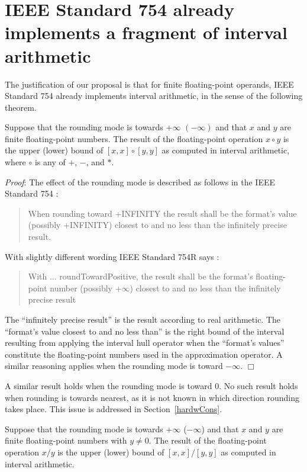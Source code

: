 \documentclass[11pt]{article}
\begin{document}
\section{IEEE Standard 754 already implements a fragment of interval
  arithmetic}
\label{fragmIA}

The justification of our proposal is that for finite floating-point operands,
IEEE Standard 754 already implements interval arithmetic, in the sense of the
following theorem.
\begin{theorem}
\label{mainThm}
Suppose that the rounding mode is towards $+\infty$
$(-\infty)$ and that $x$ and $y$ are finite floating-point numbers.
The result of the floating-point operation $x \circ y$
is the upper (lower) bound of $[x,x] \circ [y,y]$
as computed in interval arithmetic, where $\circ$ is any of $+$, $-$,
and $*$.
\end{theorem}
\emph{Proof}:
The effect of the rounding mode is described as follows in the
IEEE Standard 754 \cite{Std754}:
\begin{quote}
When rounding toward +INFINITY the result shall be the format's value
(possibly +INFINITY) closest to and no less than the infinitely
precise result.
\end{quote}
With slightly different wording IEEE Standard 754R says \cite{Std754R}:
\begin{quote}
With $\ldots$ roundTowardPositive, the result shall be the format's
floating-point number (possibly $+\infty$) closest to and no less than
the infinitely precise result
\end{quote}
The ``infinitely precise result'' is the result according to real
arithmetic. The ``format's value closest to and no less than'' is the
right bound of the interval resulting from applying the interval hull
operator when the ``format's values'' constitute the floating-point
numbers used in the approximation operator.  A similar reasoning
applies when the rounding mode is toward $-\infty$.  $\Box$

A similar result holds when the rounding mode is toward $0$.
No such result holds when rounding is towards nearest,
as it is not known in which direction rounding takes place.
This issue is addressed in Section~\ref{hardwCons}.

\begin{theorem}
\label{auxThm}
Suppose that the rounding mode is towards $+\infty$
($-\infty$) and that $x$ and $y$ are finite floating-point numbers
with $y \neq 0$.
The result of the floating-point operation $x / y$
is the upper (lower) bound of $[x,x] / [y,y]$
as computed in interval arithmetic.
\end{theorem}
\end{document}
